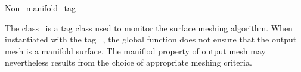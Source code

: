 

\begin{ccRefClass}{Non_manifold_tag}  %


\ccDefinition
  
The class \ccRefName\ is a tag class used to monitor the
surface meshing algorithm. When instantiated with the tag
\ccRefName\ , the global function 
does not ensure that the output mesh  is a  manifold surface.
The maniflod property of output mesh
 may nevertheless results from the choice of
appropriate meshing criteria.











\ccSeeAlso

\\
 \\
 \\




\end{ccRefClass}


